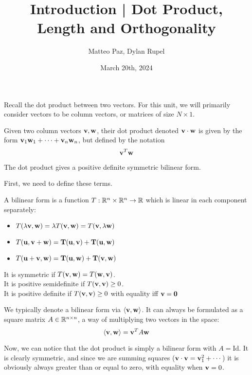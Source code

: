 \documentclass{article}
\author{Matteo Paz, Dylan Rupel}
\date{March 20th, 2024}
\title{Introduction | Dot Product, Length and Orthogonality}
\begin{document}
    \maketitle{}
    \noindent

    Recall the dot product between two vectors. For this unit, we will primarily consider vectors to be column vectors, or matrices of size $N \times 1$.
    \begin{definition}
        Given two column vectors $\mathbf{v}, \mathbf{w}$, their dot product denoted $\mathbf{v} \cdot \mathbf{w}$ is given by the form $\mathbf{v}_1\mathbf{w}_1 +\cdots + \mathbf{v}_n\mathbf{w}_n$, but defined by the notation 
        \[\mathbf{v}^T \mathbf{w}\]
    \end{definition}

    \begin{proposition}
        The dot product gives a positive definite symmetric bilinear form.
    \end{proposition}

    First, we need to define these terms.
    \begin{definition}
        A bilinear form is a function $T: \mathbb{R}^n \times \mathbb{R}^n \to \mathbb{R}$ which is linear in each component separately:
        \begin{itemize}
            \item $T(\lambda \mathbf{v}, \mathbf{w}) = \lambda T(\mathbf{v},\mathbf{w}) = T(\mathbf{v}, \lambda \mathbf{w})$
            \item $T(\bf{u}, \mathbf{v} + \mathbf{w}) = T(\bf{u}, \mathbf{v}) + T(\bf{u}, \mathbf{w})$
            \item $T(\bf{u} +\mathbf{v}, \mathbf{w}) = T(\bf{u}, \mathbf{w}) + T(\mathbf{v}, \mathbf{w})$
        \end{itemize}

        It is symmetric if $T(\mathbf{v}, \mathbf{w}) = T(\mathbf{w}, \mathbf{v})$. \\
        It is positive semidefinite if $T(\mathbf{v}, \mathbf{v}) \geq 0$. \\
        It is positive definite if $T(\mathbf{v}, \mathbf{v}) \geq 0$ with equality iff $\mathbf{v} = \bf{0}$

        \vspace{1em}
        We typically denote a bilinear form via $\langle \mathbf{v}, \mathbf{w} \rangle$. It can always be formulated as a square matrix $A \in \mathbb{R}^{n \times n}$, a way of multiplying two vectors in the space:
        \[\langle \mathbf{v}, \mathbf{w} \rangle = \mathbf{v}^T A \mathbf{w}\]
    \end{definition}

    Now, we can notice that the dot product is simply a bilinear form with $A =$Id. It is clearly symmetric, and since we are summing squares ($\mathbf{v} \cdot \mathbf{v} = \mathbf{v}_1^2 +\cdots$) it is obviously always greater than or equal to zero, with equality when $\mathbf{v} = 0$. 
\end{document}

